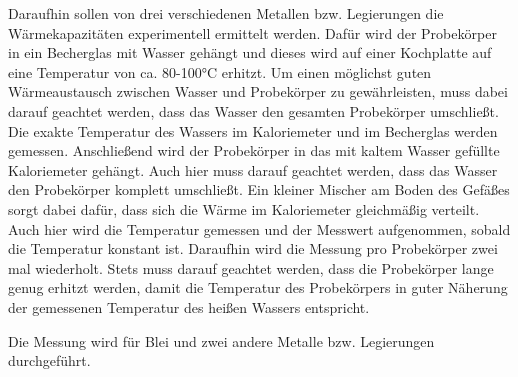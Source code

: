 Daraufhin sollen von drei verschiedenen Metallen bzw. Legierungen die Wärmekapazitäten
experimentell ermittelt werden. Dafür wird der Probekörper in ein Becherglas mit
Wasser gehängt und dieses wird auf einer Kochplatte auf eine Temperatur von ca. 80-100°C erhitzt.
Um einen möglichst guten Wärmeaustausch zwischen Wasser und Probekörper zu gewährleisten, muss dabei
darauf geachtet werden, dass das Wasser den gesamten Probekörper umschließt. Die
exakte Temperatur des Wassers im Kaloriemeter und im Becherglas werden gemessen.
Anschließend wird der Probekörper in das mit kaltem Wasser gefüllte Kaloriemeter gehängt. Auch
hier muss darauf geachtet werden, dass das Wasser den Probekörper komplett umschließt. Ein
kleiner Mischer am Boden des Gefäßes sorgt dabei dafür, dass sich die Wärme im Kaloriemeter
gleichmäßig verteilt. Auch hier wird die Temperatur gemessen und der Messwert aufgenommen,
sobald die Temperatur konstant ist. Daraufhin wird die Messung pro Probekörper zwei mal
wiederholt. Stets muss darauf geachtet werden, dass die Probekörper lange genug erhitzt
werden, damit die Temperatur des Probekörpers in guter Näherung der gemessenen Temperatur
des heißen Wassers entspricht.

Die Messung wird für Blei und zwei andere Metalle bzw. Legierungen durchgeführt.
